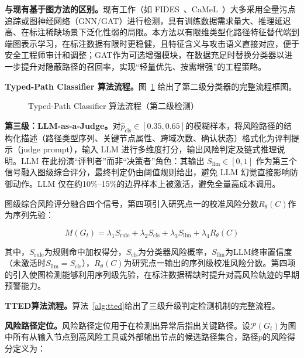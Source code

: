 \textbf{与现有基于图方法的区别。}现有工作（如 FIDES~\cite{costa2025fides}、CaMeL~\cite{debenedetti2025camel}）大多采用全量污点追踪或图神经网络（GNN/GAT）进行检测，具有训练数据需求量大、推理延迟高、在标注稀缺场景下泛化性弱的局限。本方法以有限维类型化路径特征替代端到端图表示学习，在标注数据有限时更稳健，且特征含义与攻击语义直接对应，便于安全工程师审计和调整；GAT作为可选增强模块，在数据充足时替换分类器以进一步提升对隐蔽路径的召回率，实现“轻量优先、按需增强”的工程策略。

\textbf{Typed-Path Classifier 算法流程。}图~\ref{fig:tpc_flow} 给出了第二级分类器的完整流程框图。

\begin{figure}[htbp]
  \centering
  \resizebox{0.92\textwidth}{!}{}
  \caption{Typed-Path Classifier 算法流程（第二级检测）}
  \label{fig:tpc_flow}
\end{figure}

\textbf{第三级：LLM-as-a-Judge。}对$\hat{p}_{\text{cls}} \in [0.35, 0.65]$的模糊样本，将风险路径的结构化描述（路径类型序列、关键节点属性、跨域次数、确认状态）格式化为评判提示（judge prompt），输入 LLM 进行多维度打分，输出风险判定及链式推理说明。LLM 在此扮演“评判者”而非“决策者”角色：其输出 $S_{\text{llm}} \in [0,1]$ 作为第三个信号融入图级综合评分，最终判定仍由阈值规则给出，避免 LLM 幻觉直接影响防御动作。LLM 仅在约10\%--15\%的边界样本上被激活，避免全量高成本调用。

图级综合风险评分融合四个信号，第四项引入研究点一的校准风险分数$R_\theta(C)$作为序列先验：

\begin{equation}
  M(G_t) = \lambda_1 S_{\text{rule}} + \lambda_2 S_{\text{cls}} + \lambda_3 S_{\text{llm}} + \lambda_4 R_\theta(C)
  \label{eq:graph_score}
\end{equation}

其中，$S_{\text{rule}}$为规则命中加权得分，$S_{\text{cls}}$为分类器风险概率，$S_{\text{llm}}$为LLM终审置信度（未激活时$S_{\text{llm}}=S_{\text{cls}}$），$R_\theta(C)$为研究点一输出的序列级校准风险分数。第四项的引入使图检测能够利用序列级先验，在标注数据稀缺时提升对高风险轨迹的早期预警能力。

\textbf{TTED算法流程。}算法~\ref{alg:tted}给出了三级升级判定检测机制的完整流程。



\textbf{风险路径定位。}风险路径定位用于在检测出异常后指出关键路径。设$\mathcal{P}(G_t)$为图中所有从输入节点到高风险工具或外部输出节点的候选路径集合，路径$p$的风险得分定义为：

